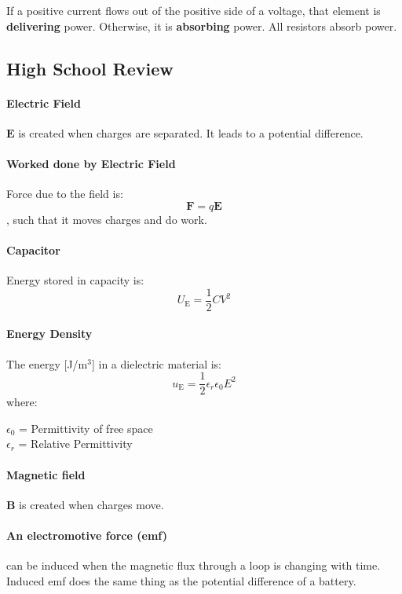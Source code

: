 \documentclass[11pt]{article}
\begin{document}
    \begin{definition}
    If a positive current flows out of the positive side of a voltage, that element is \textbf{delivering} power. Otherwise, it is \textbf{absorbing} power. All resistors absorb power.
    \end{definition}
\subsection{High School Review}
\paragraph{Electric Field} $\textbf{E}$ is created when charges are separated. It leads to a potential difference.
\paragraph{Worked done by Electric Field} Force due to the field is:
\begin{equation}
    \textbf{F} = q\textbf{E}
\end{equation}
, such that it moves charges and do work.
\paragraph{Capacitor} Energy stored in capacity is:
\begin{equation}
    U_\text{E} = \frac{1}{2}CV^2
\end{equation}
\paragraph{Energy Density} The energy [J/m$^3$] in a dielectric material is:
\begin{equation}
    u_\text{E} = \frac{1}{2}\epsilon_r \epsilon_0 E^2
\end{equation}
where:
\begin{center}
    $\epsilon_0$ = Permittivity of free space \\
    $\epsilon_r$ = Relative Permittivity
\end{center}
\paragraph{Magnetic field} \textbf{B} is created when charges move.
\paragraph{An electromotive force (emf)} can be induced when the magnetic flux
through a loop is changing with time. Induced emf does the same thing as the potential difference of a
battery. 
\end{document}
